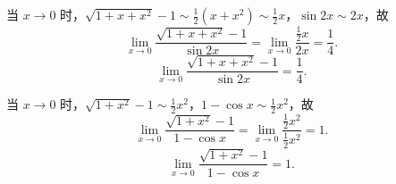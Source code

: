 \begin{solution}

    当 $x \to 0$ 时，$\sqrt{1+x+x^2}-1 \sim \frac{1}{2}(x + x^2) \sim \frac{1}{2}x$，$\sin 2x \sim 2x$，故
    \begin{equation}
        \lim_{x\to 0} \frac{\sqrt{1+x+x^2}-1}{\sin 2x} = \lim_{x\to 0} \frac{\frac{1}{2}x}{2x} = \frac{1}{4}.
    \end{equation}
    \begin{equation}
        \boxed{\lim_{x\to 0} \frac{\sqrt{1+x+x^2}-1}{\sin 2x} = \frac{1}{4}.}
    \end{equation}


    当 $x \to 0$ 时，$\sqrt{1+x^2}-1 \sim \frac{1}{2}x^2$，$1 - \cos x \sim \frac{1}{2}x^2$，故
    \begin{equation}
        \lim_{x\to 0} \frac{\sqrt{1+x^2}-1}{1-\cos x} = \lim_{x\to 0} \frac{\frac{1}{2}x^2}{\frac{1}{2}x^2} = 1.
    \end{equation}
    \begin{equation}
        \boxed{\lim_{x\to 0} \frac{\sqrt{1+x^2}-1}{1-\cos x} = 1.}
    \end{equation}
\end{solution}

\endinput
